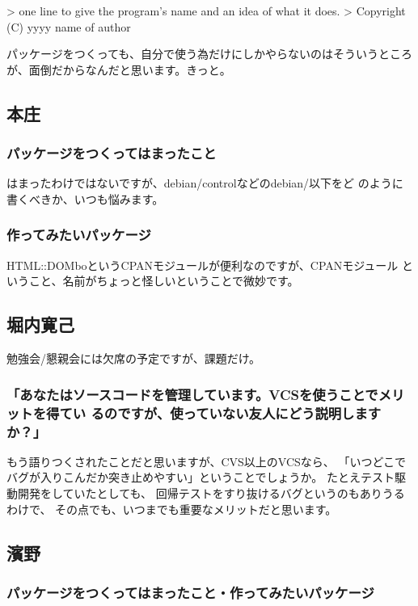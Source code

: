 \documentclass[mingoth,a4paper]{jsarticle}
\begin{document}
\begin{commandline}
 > one line to give the program's name and an idea of what it does.
 > Copyright (C) yyyy name of author
\end{commandline}

パッケージをつくっても、自分で使う為だけにしかやらないのはそういうところが、面倒だからなんだと思います。きっと。

\subsection{本庄}
\subsubsection{パッケージをつくってはまったこと}
はまったわけではないですが、debian/controlなどのdebian/以下をど
のように書くべきか、いつも悩みます。

\subsubsection{作ってみたいパッケージ}
HTML::DOMboというCPANモジュールが便利なのですが、CPANモジュール
ということ、名前がちょっと怪しいということで微妙です。


\subsection{堀内寛己}

勉強会/懇親会には欠席の予定ですが、課題だけ。

\subsubsection{「あなたはソースコードを管理しています。VCSを使うことでメリットを得てい
るのですが、使っていない友人にどう説明しますか？」}

もう語りつくされたことだと思いますが、CVS以上のVCSなら、
「いつどこでバグが入りこんだか突き止めやすい」ということでしょうか。
たとえテスト駆動開発をしていたとしても、
回帰テストをすり抜けるバグというのもありうるわけで、
その点でも、いつまでも重要なメリットだと思います。

\subsection{濱野}

\subsubsection{パッケージをつくってはまったこと・作ってみたいパッケージ}
\end{document}

